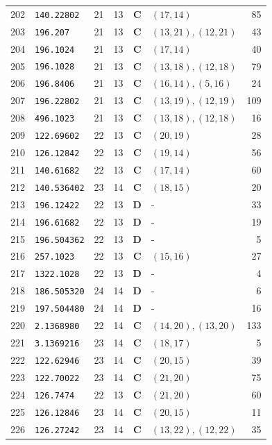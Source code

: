 \documentclass[11pt,a4paper]{article}
\begin{document}
\begin{small}
\begin{longtable}{r l c c c l r}
202 & \texttt{140.22802} & 21 & 13 & \textbf{C} & $(17,14)$ & 85 \\
203 & \texttt{196.207} & 21 & 13 & \textbf{C} & $(13,21), (12,21)$ & 43 \\
204 & \texttt{196.1024} & 21 & 13 & \textbf{C} & $(17,14)$ & 40 \\
205 & \texttt{196.1028} & 21 & 13 & \textbf{C} & $(13,18), (12,18)$ & 79 \\
206 & \texttt{196.8406} & 21 & 13 & \textbf{C} & $(16,14), (5,16)$ & 24 \\
207 & \texttt{196.22802} & 21 & 13 & \textbf{C} & $(13,19), (12,19)$ & 109 \\
208 & \texttt{496.1023} & 21 & 13 & \textbf{C} & $(13,18), (12,18)$ & 16 \\
209 & \texttt{122.69602} & 22 & 13 & \textbf{C} & $(20,19)$ & 28 \\
210 & \texttt{126.12842} & 22 & 13 & \textbf{C} & $(19,14)$ & 56 \\
211 & \texttt{140.61682} & 22 & 13 & \textbf{C} & $(17,14)$ & 60 \\
212 & \texttt{140.536402} & 23 & 14 & \textbf{C} & $(18,15)$ & 20 \\
213 & \texttt{196.12422} & 22 & 13 & \textbf{D} & - & 33 \\
214 & \texttt{196.61682} & 22 & 13 & \textbf{D} & - & 19 \\
215 & \texttt{196.504362} & 22 & 13 & \textbf{D} & - & 5 \\
216 & \texttt{257.1023} & 22 & 13 & \textbf{C} & $(15,16)$ & 27 \\
217 & \texttt{1322.1028} & 22 & 13 & \textbf{D} & - & 4 \\
218 & \texttt{186.505320} & 24 & 14 & \textbf{D} & - & 6 \\
219 & \texttt{197.504480} & 24 & 14 & \textbf{D} & - & 16 \\
220 & \texttt{2.1368980} & 22 & 14 & \textbf{C} & $(14,20), (13,20)$ & 133 \\
221 & \texttt{3.1369216} & 23 & 14 & \textbf{C} & $(18,17)$ & 5 \\
222 & \texttt{122.62946} & 23 & 14 & \textbf{C} & $(20,15)$ & 39 \\
223 & \texttt{122.70022} & 23 & 14 & \textbf{C} & $(21,20)$ & 75 \\
224 & \texttt{126.7474} & 22 & 13 & \textbf{C} & $(21,20)$ & 60 \\
225 & \texttt{126.12846} & 23 & 14 & \textbf{C} & $(20,15)$ & 11 \\
226 & \texttt{126.27242} & 23 & 14 & \textbf{C} & $(13,22), (12,22)$ & 35 \\

\end{longtable}
\end{small}
\end{document}
